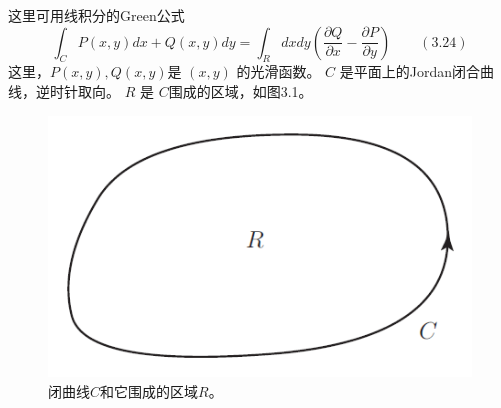 这里可用线积分的Green公式
\begin{equation}
\int_{C} P(x, y) d x+Q(x, y) d y=\int_{R} d x d y\left(\frac{\partial Q}{\partial x}-\frac{\partial P}{\partial y}\right)\quad \quad (3.24)
\end{equation}
这里，$ P(x,y),Q(x,y) $是 $(x,y)$ 的光滑函数。 $C$ 是平面上的Jordan闭合曲线，逆时针取向。 $R$ 是 $C $围成的区域，如图3.1。
\begin{figure}[h]
	\centering
	\includegraphics[width=0.6\linewidth]{fig/3.1.png}
	\caption{闭曲线$C$和它围成的区域$R$。}
\end{figure}

